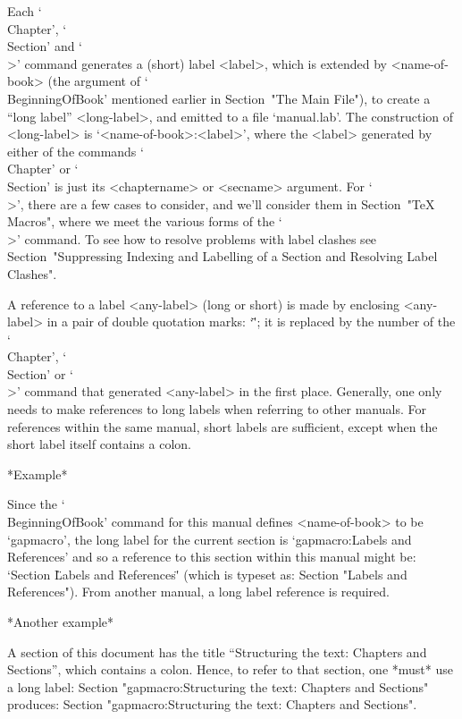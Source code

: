 Each `\\Chapter', `\\Section' and `\\>' command generates a (short) label
<label>,  which  is  extended  by   <name-of-book>   (the   argument   of
`\\BeginningOfBook' mentioned earlier in  Section~"The  Main  File"),  to
create a ``long label'' <long-label>, and emitted to a file `manual.lab'.
The construction of <long-label> is `<name-of-book>:<label>',  where  the
<label> generated by either of the commands `\\Chapter' or `\\Section' is
just its <chaptername> or <secname> argument. For `\\>', there are a  few
cases to consider, and we'll consider them in Section~"TeX Macros", where
we meet the various forms of the `\\>' command. To  see  how  to  resolve
problems  with  label  clashes  see  Section~"Suppressing  Indexing   and
Labelling of a Section and Resolving Label Clashes".

A reference to a label <any-label> (long or short) is made  by  enclosing
<any-label> in a pair of double quotation marks: `\"<any-label>\"'; it is
replaced by the number of the `\\Chapter', `\\Section' or  `\\>'  command
that generated <any-label> in the first place. Generally, one only  needs
to make references to long labels when referring to  other  manuals.  For
references within the same manual, short labels  are  sufficient,  except
when the short label itself contains a colon.

*Example*

Since  the  `\\BeginningOfBook'   command   for   this   manual   defines
<name-of-book> to be `gapmacro',
the long label for  the  current  section  is
`gapmacro:Labels and References'
and so a reference  to  this  section  within
this manual might be:  `Section  \"Labels  and  References\"'  (which  is
typeset as: Section "Labels and References"). From another manual, a long
label reference is required.

*Another example*

A section of this document has the title
``Structuring the text: Chapters and Sections'',
which contains a colon. Hence, to refer to that section, one *must* use a
long label: 
\begintt
Section "gapmacro:Structuring the text: Chapters and Sections"
\endtt
produces: Section "gapmacro:Structuring the text: Chapters and Sections".

